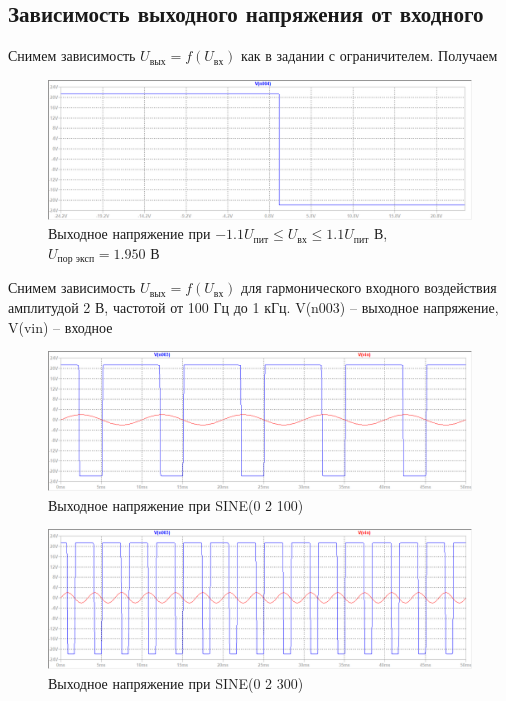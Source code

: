 \documentclass[a4paper, 12pt]{article}
\begin{document}
    \subsection{Зависимость выходного напряжения от входного}
    Снимем зависимость $U_\text{вых}=f\left( U_\text{вх} \right)$ как в задании с ограничителем.
    Получаем
    \begin{figure}[H]
        \centering
        \includegraphics[scale=0.46]{6task_fuin.png}
        \captionsetup{skip=0pt}
        \caption{Выходное напряжение при $-1.1U_\text{пит}\leq U_\text{вх}\leq 1.1U_\text{пит}$ В, $U_\text{пор эксп}=1.950$ В}
        \label{fig:6task_fuin}
    \end{figure}
    \noindent Снимем зависимость $U_\text{вых}=f\left( U_\text{вх} \right)$ для гармонического
    входного воздействия амплитудой 2 В, частотой от 100 Гц до 1 кГц. V(n003) -- выходное напряжение,
    V(vin) -- входное
    \begin{figure}[H]
        \centering
        \includegraphics[scale=0.46]{6task_sine_2V_100f.png}
        \captionsetup{skip=0pt}
        \caption{Выходное напряжение при SINE(0 2 100)}
        \label{fig:6task_sine_2V_100f}
    \end{figure}
    \begin{figure}[H]
        \centering
        \includegraphics[scale=0.46]{6task_sine_2V_300f.png}
        \captionsetup{skip=0pt}
        \caption{Выходное напряжение при SINE(0 2 300)}
        \label{fig:6task_sine_2V_300f}
    \end{figure}
\end{document}
